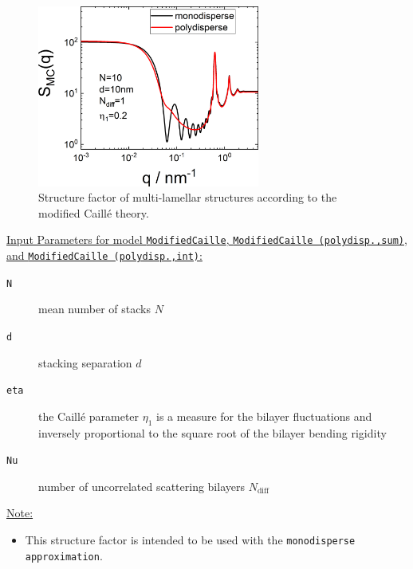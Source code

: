 \begin{figure}[htb]
\begin{center}
\includegraphics[width=0.65\textwidth]{../images/structure_factor/Lamellar/MCLamellar.png}
\end{center}
\caption{Structure factor of multi-lamellar structures according to the modified Caill\'e theory.}
\label{fig:MCLamellar}
\end{figure}

\vspace{5mm}

\noindent
\uline{Input Parameters for model \texttt{ModifiedCaille}, \texttt{ModifiedCaille (polydisp.,sum)}, and  \texttt{ModifiedCaille (polydisp.,int)}:}
\begin{description}
\item[\texttt{N}] mean number of stacks $N$
\item[\texttt{d}] stacking separation $d$
\item[\texttt{eta}]  the Caill\'e parameter $\eta_1$ is a measure for the bilayer
fluctuations and inversely proportional to the square root of
the bilayer bending rigidity
\item[\texttt{Nu}]   number of uncorrelated scattering bilayers $N_\text{diff}$
\end{description}

\noindent\uline{Note:}
\begin{itemize}
\item This structure factor is intended to be used with the \texttt{monodisperse approximation}.
\end{itemize}

\clearpage
